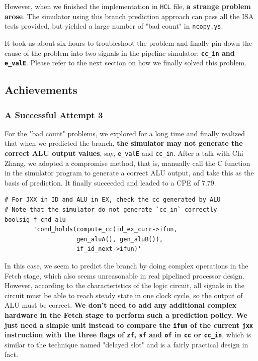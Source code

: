 \documentclass[12pt,a4paper]{article}
\begin{document}
However, when we finished the implementation in \texttt{HCL} file, \textbf{a strange problem arose}. The simulator using this branch prediction approach can pass all the ISA tests provided, but yielded a large number of "bad count" in \texttt{ncopy.ys}. 

It took us about six hours to troubleshoot the problem and finally pin down the cause of the problem into two signals in the pipeline simulator: \textbf{\texttt{cc\_in} and \texttt{e\_valE}}. Please refer to the next section on how we finally solved this problem.
\subsection{Achievements}
\subsubsection{A Successful Attempt 3}
For the "bad count" problems, we explored for a long time and finally realized that when we predicted the branch, \textbf{the simulator may not generate the correct ALU output values}, say, \texttt{e\_valE} and \texttt{cc\_in}. After a talk with Chi Zhang, we adopted a compromise method, that is, manually call the C function in the simulator program to generate a correct ALU output, and take this as the basis of prediction. It finally succeeded and leaded to a CPE of $7.79$.

\begin{lstlisting}
# For JXX in ID and ALU in EX, check the cc generated by ALU
# Note that the simulator do not generate `cc_in` correctly
boolsig f_cnd_alu 
        'cond_holds(compute_cc(id_ex_curr->ifun, 
                    gen_aluA(), gen_aluB()), 
                    if_id_next->ifun)'
\end{lstlisting}

In this case, we seem to predict the branch by doing complex operations in the Fetch stage, which also seems unreasonable in real pipelined processor design. However, according to the characteristics of the logic circuit, all signals in the circuit must be able to reach steady state in one clock cycle, so the output of ALU must be correct. \textbf{We don't need to add any additional complex hardware in the Fetch stage to perform such a prediction policy. We just need a simple unit instead to compare the \texttt{ifun} of the current \texttt{jxx} instruction with the three flags of \texttt{zf}, \texttt{sf} and \texttt{of} in \texttt{cc} or \texttt{cc\_in}}, which is similar to the technique named "delayed slot" and is a fairly practical design in fact. 
\end{document}
